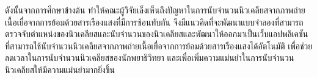 \documentclass[12pt,oneside,openright,a4paper]{cpe-thai-project}
\begin{document}
ดังนั้นจากการศึกษาข้างต้น ทำให้คณะผู้วิจัยเล็งเห็นถึงปัญหาในการนับจำนวนนิวเคลียสจากภาพถ่ายเนื้อเยื่อจากการย้อมด้วยสารเรืองแสงที่มีการซ้อนทับกัน จึงมีแนวคิดที่จะพัฒนาแบบจำลองที่สามารถตรวจจับตำแหน่งของนิวเคลียสและนับจำนวนของนิวเคลียสและพัฒนาให้ออกมาเป็นเว็บแอปพลิเคชันที่สามารถใช้นับจำนวนนิวเคลียสจากภาพถ่ายเนื้อเยื่อจากการย้อมด้วยสารเรืองแสงได้อัตโนมัติ เพื่อช่วยลดเวลาในการนับจำนวนนิวเคลียสของนักพยาธิวิทยา และเพื่อเพิ่มความแม่นยำในการนับจำนวนนิวเคลียสให้มีความแม่นยำมากยิ่งขึ้น





\end{document}
